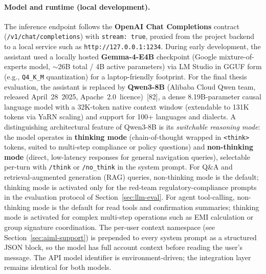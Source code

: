 \documentclass[12pt, a4paper]{report}
\begin{document}
\paragraph{Model and runtime (local development).}
The inference endpoint follows the \textbf{OpenAI Chat Completions} contract (\texttt{/v1/chat/completions}) with \texttt{stream: true}, proxied from the project backend to a local service such as \texttt{http://127.0.0.1:1234}. During early development, the assistant used a locally hosted \textbf{Gemma-4-E4B} checkpoint (Google mixture-of-experts model, $\sim$26B total / 4B active parameters) via LM Studio in GGUF form (e.g., \texttt{Q4\_K\_M} quantization) for a laptop-friendly footprint. For the final thesis evaluation, the assistant is replaced by \textbf{Qwen3-8B} (Alibaba Cloud Qwen team, released April~28~2025, Apache~2.0~licence)~[82], a dense 8.19B-parameter causal language model with a 32K-token native context window (extendable to 131K tokens via YaRN scaling) and support for 100+ languages and dialects. A distinguishing architectural feature of Qwen3-8B is its \emph{switchable reasoning mode}: the model operates in \textbf{thinking mode} (chain-of-thought wrapped in \texttt{<think>} tokens, suited to multi-step compliance or policy questions) and \textbf{non-thinking mode} (direct, low-latency responses for general navigation queries), selectable per-turn with \texttt{/think} or \texttt{/no\_think} in the system prompt. For Q\&A and retrieval-augmented generation (RAG) queries, non-thinking mode is the default; thinking mode is activated only for the red-team regulatory-compliance prompts in the evaluation protocol of Section~\ref{sec:llm-eval}. For agent tool-calling, non-thinking mode is the default for read tools and confirmation summaries; thinking mode is activated for complex multi-step operations such as EMI calculation or group signature coordination. The per-user context namespace (see Section~\ref{sec:aiml-support}) is prepended to every system prompt as a structured JSON block, so the model has full account context before reading the user's message. The API model identifier is environment-driven; the integration layer remains identical for both models.
\end{document}
